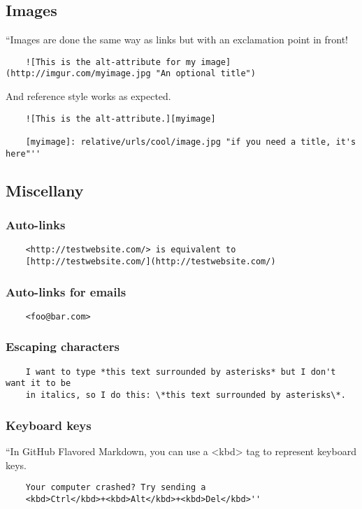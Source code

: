 \documentclass[oneside]{book}
\numberwithin{equation}{section}
\begin{document}
\subsection{Images}
``Images are done the same way as links but with an exclamation point in front!
\begin{verbatim}
	![This is the alt-attribute for my image](http://imgur.com/myimage.jpg "An optional title")
\end{verbatim}
And reference style works as expected.
\begin{verbatim}
	![This is the alt-attribute.][myimage]
	
	[myimage]: relative/urls/cool/image.jpg "if you need a title, it's here"''
\end{verbatim}

\subsection{Miscellany}

\subsubsection{Auto-links}
\begin{verbatim}
	<http://testwebsite.com/> is equivalent to
	[http://testwebsite.com/](http://testwebsite.com/)
\end{verbatim}

\subsubsection{Auto-links for emails}
\begin{verbatim}
	<foo@bar.com>
\end{verbatim}

\subsubsection{Escaping characters}
\begin{verbatim}
	I want to type *this text surrounded by asterisks* but I don't want it to be
	in italics, so I do this: \*this text surrounded by asterisks\*.
\end{verbatim}

\subsubsection{Keyboard keys}
``In GitHub Flavored Markdown, you can use a <kbd> tag to represent keyboard keys.
\begin{verbatim}
	Your computer crashed? Try sending a
	<kbd>Ctrl</kbd>+<kbd>Alt</kbd>+<kbd>Del</kbd>''
\end{verbatim}
\end{document}
